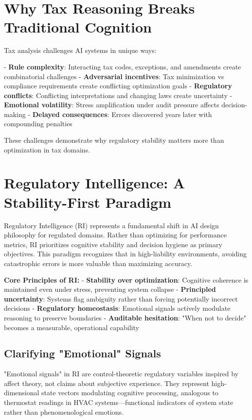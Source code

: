 \documentclass[12pt,a4paper]{article}
\begin{document}
\section{Why Tax Reasoning Breaks Traditional Cognition}

Tax analysis challenges AI systems in unique ways:

- \textbf{Rule complexity}: Interacting tax codes, exceptions, and amendments create combinatorial challenges
- \textbf{Adversarial incentives}: Tax minimization vs compliance requirements create conflicting optimization goals
- \textbf{Regulatory conflicts}: Conflicting interpretations and changing laws create uncertainty
- \textbf{Emotional volatility}: Stress amplification under audit pressure affects decision-making
- \textbf{Delayed consequences}: Errors discovered years later with compounding penalties

These challenges demonstrate why regulatory stability matters more than optimization in tax domains.

\section{Regulatory Intelligence: A Stability-First Paradigm}

Regulatory Intelligence (RI) represents a fundamental shift in AI design philosophy for regulated domains. Rather than optimizing for performance metrics, RI prioritizes cognitive stability and decision hygiene as primary objectives. This paradigm recognizes that in high-liability environments, avoiding catastrophic errors is more valuable than maximizing accuracy.

\textbf{Core Principles of RI:}
- \textbf{Stability over optimization}: Cognitive coherence is maintained even under stress, preventing system collapse
- \textbf{Principled uncertainty}: Systems flag ambiguity rather than forcing potentially incorrect decisions
- \textbf{Regulatory homeostasis}: Emotional signals actively modulate reasoning to preserve boundaries
- \textbf{Auditable hesitation}: "When not to decide" becomes a measurable, operational capability

\subsection{Clarifying "Emotional" Signals}

"Emotional signals" in RI are control-theoretic regulatory variables inspired by affect theory, not claims about subjective experience. They represent high-dimensional state vectors modulating cognitive processing, analogous to thermostat readings in HVAC systems—functional indicators of system state rather than phenomenological emotions.
\end{document}
